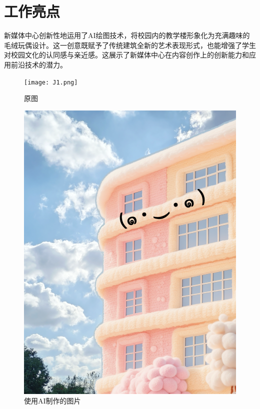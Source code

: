 \documentclass{article}
\begin{document}
\section{工作亮点}
新媒体中心创新性地运用了AI绘图技术，将校园内的教学楼形象化为充满趣味的毛绒玩偶设计。这一创意既赋予了传统建筑全新的艺术表现形式，也能增强了学生对校园文化的认同感与亲近感。这展示了新媒体中心在内容创作上的创新能力和应用前沿技术的潜力。
\begin{figure}[H]
    \centering
    \begin{minipage}[b]{0.45\textwidth}
        \centering
        \texttt{[image: J1.png]} %
        \caption{原图}
        \label{fig:image1}
    \end{minipage}
    \begin{minipage}[b]{0.45\textwidth}
        \centering
        \includegraphics[width=\textwidth]{J2.png} %
        \caption{使用AI制作的图片}
        \label{fig:image2}
    \end{minipage}
\end{figure}
\end{document}
